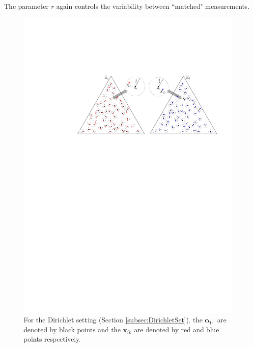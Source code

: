 \documentclass[11pt]{article} %
\begin{document}
 The parameter $r$ again controls the variability between ``matched" measurements.
    \begin{figure}
	\begin{center}
    \includegraphics[scale=0.75]{Dirichlet_alpha_r_multiple_sancar.pdf}
   \caption{ For the  Dirichlet setting (Section \ref{subsec:DirichletSet}),  the $\bm{\alpha_i},$ are denoted by black points and the $\bm{x}_{ik}$ are denoted by red and blue points respectively.}
\label{fig:Fig2}
	\end{center}
  \end{figure}
\end{document}
